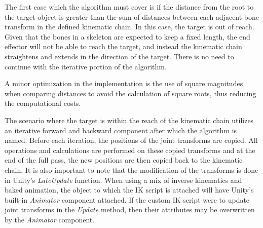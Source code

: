 The first case which the algorithm must cover is if the distance from the root
to the target object is greater than the sum of distances between each adjacent
bone transform in the defined kinematic chain. In this case, the target is out
of reach. Given that the bones in a skeleton are expected to keep a fixed
length, the end effector will not be able to reach the target, and instead the
kinematic chain straightens and extends in the direction of the target. There is
no need to continue with the iterative portion of the algorithm.

A minor optimization in the implementation is the use of square magnitudes when
comparing distances to avoid the calculation of square roots, thus reducing the
computational costs.




The scenario where the target is within the reach of the kinematic chain
utilizes an iterative forward and backward component after which the algorithm is
named. Before each iteration, the positions of the joint transforms are copied.
All operations and calculations are performed on these copied transforms and at
the end of the full pass, the new positions are then copied back to the
kinematic chain. It is also important to note that the modification of the
transforms is done in Unity's \textit{LateUpdate} function. When using a mix of
inverse kinematics and baked animation, the object to which the IK script is
attached will have Unity's built-in \textit{Animator} component attached. If the
custom IK script were to update joint transforms in the \textit{Update} method,
then their attributes may be overwritten by the \textit{Animator} component. 

